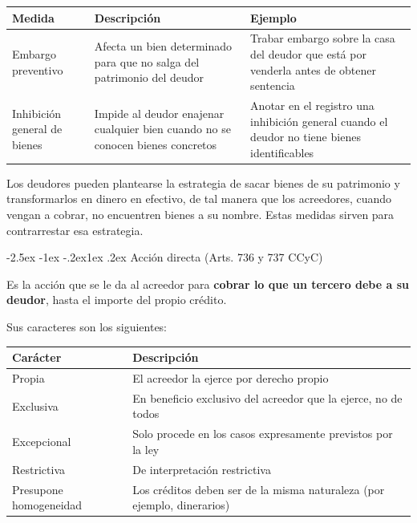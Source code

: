 \documentclass[12pt,oneside]{book}
\makeatletter
\renewcommand\subsection{\@startsection{subsection}{2}{\z@}%
  {-2.5ex \@plus -1ex \@minus -.2ex}{1ex \@plus .2ex}%
  {\normalfont\normalsize\bfseries}}
\newenvironment{tabla}{%
    \par\medskip\begingroup\small\renewcommand{\arraystretch}{1.3}\noindent\ignorespaces
}{%
    \par\endgroup\medskip
}
\makeatother
\begin{document}
\begin{tabla}
\begin{tabularx}{\textwidth}{B{3.4cm}YY}
\toprule
Medida & \textbf{Descripción} & \textbf{Ejemplo} \\
\midrule
Embargo preventivo & Afecta un bien determinado para que no salga del patrimonio del deudor & Trabar embargo sobre la casa del deudor que está por venderla antes de obtener sentencia \\
Inhibición general de bienes & Impide al deudor enajenar cualquier bien cuando no se conocen bienes concretos & Anotar en el registro una inhibición general cuando el deudor no tiene bienes identificables \\
\bottomrule
\end{tabularx}
\end{tabla}

Los deudores pueden plantearse la estrategia de sacar bienes de su patrimonio y transformarlos en dinero en efectivo, de tal manera que los acreedores, cuando vengan a cobrar, no encuentren bienes a su nombre. Estas medidas sirven para contrarrestar esa estrategia.

\subsection{Acción directa (Arts. 736 y 737 CCyC)}

\begin{definicion}
Es la acción que se le da al acreedor para \textbf{cobrar lo que un tercero debe a su deudor}, hasta el importe del propio crédito.
\end{definicion}

Sus caracteres son los siguientes:

\begin{tabla}
\begin{tabularx}{\textwidth}{B{3.6cm}Y}
\toprule
Carácter & \textbf{Descripción} \\
\midrule
Propia & El acreedor la ejerce por derecho propio \\
Exclusiva & En beneficio exclusivo del acreedor que la ejerce, no de todos \\
Excepcional & Solo procede en los casos expresamente previstos por la ley \\
Restrictiva & De interpretación restrictiva \\
Presupone homogeneidad & Los créditos deben ser de la misma naturaleza (por ejemplo, dinerarios) \\
\bottomrule
\end{tabularx}
\end{tabla}
\end{document}
